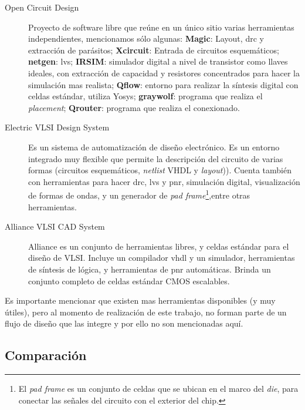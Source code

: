 \begin{description}
\item[Open Circuit Design] Proyecto de software libre que reúne en un único sitio varias herramientas independientes, mencionamos sólo algunas:  \textbf{Magic}: Layout, \gls{drc} y extracción de parásitos; \textbf{Xcircuit}: Entrada de circuitos esquemáticos; \textbf{netgen}: \gls{lvs}; \textbf{IRSIM}: simulador digital a nivel de transistor como llaves ideales, con extracción de capacidad y resistores concentrados para hacer la simulación mas realista; \textbf{Qflow}: entorno para realizar la síntesis digital con celdas estándar, utiliza Yosys\cite{Yosys}; \textbf{graywolf}: programa que realiza el \emph{placement}; \textbf{Qrouter}: programa que realiza el conexionado.

\item[Electric VLSI Design System\cite{Electric}] Es un sistema de automatización de diseño electrónico. Es un entorno integrado muy flexible que permite la descripción del circuito de varias formas (circuitos esquemáticos, \emph{netlist} VHDL y \emph{layout})). Cuenta también con herramientas para hacer \gls{drc}, \gls{lvs} y \gls{pnr}, simulación digital, visualización de formas de ondas, y un generador de \emph{pad frame}\footnote{El \emph{pad frame} es un conjunto de celdas que se ubican en el marco del \emph{die}, para conectar las señales del circuito con el exterior del chip.},entre otras herramientas.

\item[Alliance VLSI CAD System\cite{Alliance}] Alliance es un conjunto de herramientas libres, y celdas estándar para el diseño de VLSI. Incluye un compilador vhdl y un simulador, herramientas de síntesis de lógica, y herramientas de \gls{pnr} automáticas. Brinda un conjunto completo de celdas estándar CMOS escalables.

\end{description}

Es importante mencionar que existen mas herramientas disponibles (y muy útiles), pero al momento de realización de este trabajo, no forman parte de un flujo de diseño que las integre y por ello no son mencionadas aquí. 

\subsection{Comparación}



